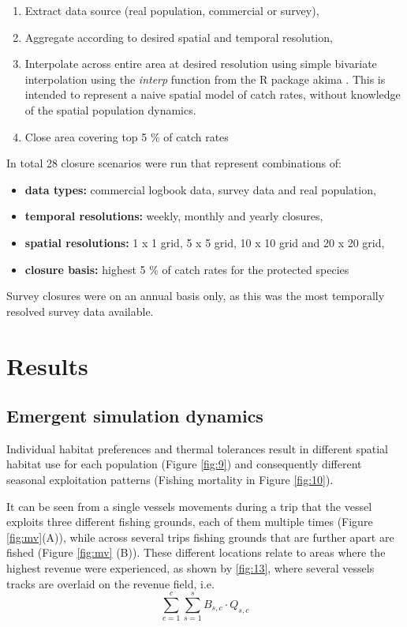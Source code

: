 \documentclass[review]{elsarticle}
\begin{document}
\begin{enumerate}
	\item Extract data source (real population, commercial or survey), 
	\item Aggregate according to desired spatial and temporal resolution,
	\item Interpolate across entire area at desired resolution using simple
		bivariate interpolation using the \emph{interp} function from
		the R package akima \citep{Akima2006}. This is intended to
		represent a naive spatial model of catch rates, without
		knowledge of the spatial population dynamics.
	\item Close area covering top 5 \% of catch rates 
\end{enumerate}
In total 28 closure scenarios were run that represent combinations of:

\begin{itemize}
	\item \textbf{data types:} commercial logbook data, survey data and
		real population,
	\item \textbf{temporal resolutions:} weekly, monthly and yearly
		closures,
	\item \textbf{spatial resolutions:} 1 x 1 grid, 5 x 5 grid, 10 x 10
		grid and 20 x 20 grid,
	\item \textbf{closure basis:} highest 5 \%  of catch rates for the
		protected species
\end{itemize}

Survey closures were on an annual basis only, as this was the most temporally
resolved survey data available.

\section{Results}

\subsection{Emergent simulation dynamics}

Individual habitat preferences and thermal tolerances result in different
spatial habitat use for each population (Figure \ref{fig:9}) and consequently
different seasonal exploitation patterns (Fishing mortality in Figure
\ref{fig:10}). 

It can be seen from a single vessels movements during a trip that the vessel
exploits three different fishing grounds, each of them multiple times (Figure
\ref{fig:mv}(A)), while across several trips fishing grounds that are further
apart are fished (Figure \ref{fig:mv} (B)). These different locations relate to
areas where the highest revenue were experienced, as shown by
 \ref{fig:13}, where several vessels tracks are
overlaid on the revenue field, i.e. $$\sum^c_{c=1}\sum^s_{s=1} B_{s,c} \cdot
Q_{s,c}$$
\end{document}
